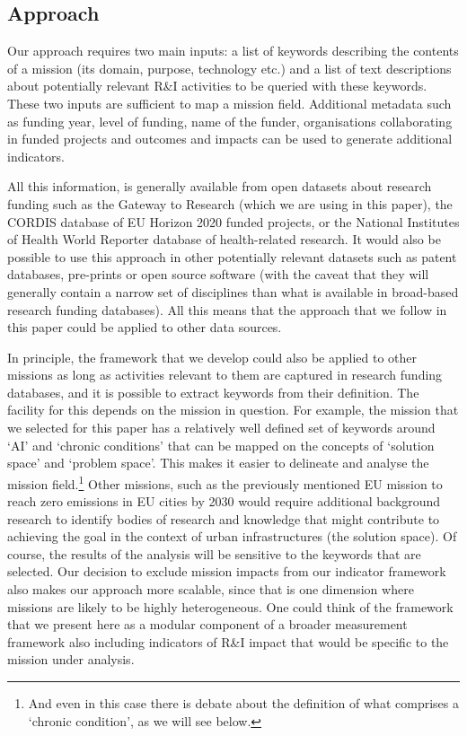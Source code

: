 \documentclass[11pt]{article}
\begin{document}
\subsection{Approach}

Our approach requires two main inputs: a list of keywords describing the contents of a mission (its domain, purpose, technology etc.) and a list of text descriptions about potentially relevant R&I activities to be queried with these keywords. These two inputs are sufficient to map a mission field. Additional metadata such as funding year, level of funding, name of the funder, organisations collaborating in funded projects and outcomes and impacts can be used to  generate additional indicators. 

All this information, is generally available from open datasets about research funding such as the Gateway to Research (which we are using in this paper), the CORDIS database of EU Horizon 2020 funded projects, or the National Institutes of Health World Reporter database of health-related research. It would also be possible to use this approach in other potentially relevant datasets such as patent databases, pre-prints or open source software (with the caveat that they will generally contain a narrow set of disciplines than what is available in broad-based research funding databases). All this means that the approach that we follow in this paper could be applied to other data sources.

In principle, the framework that we develop could also be applied to other missions as long as activities relevant to them are captured in research funding databases, and it is possible to extract keywords from their definition. The facility for this depends on the mission in question. For example, the mission that we selected for this paper has a relatively well defined set of keywords around `AI’ and `chronic conditions’ that can be mapped on the concepts of ‘solution space’ and ‘problem space’. This makes it easier to delineate and analyse the mission field.\footnote{And even in this case there is debate about the definition of what comprises a `chronic condition’, as we will see below.} Other missions, such as the previously mentioned EU mission to reach zero emissions in EU cities by 2030 would require additional background research to identify bodies of research and knowledge that might contribute to achieving the goal in the context of urban infrastructures (the solution space). Of course, the results of the analysis will be sensitive to the keywords that are selected. Our decision to exclude mission impacts from our indicator framework also makes our approach more scalable, since that is one dimension where missions are likely to be highly heterogeneous. One could think of the framework that we present here as a modular component of a broader measurement framework also including indicators of R&I impact that would be specific to the mission under analysis.
\end{document}

